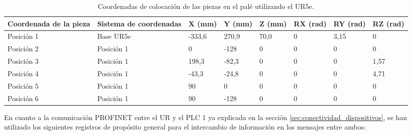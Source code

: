 \begin{table}[H]
\begin{center}

\renewcommand{\arraystretch}{1.5}
\begin{tabular}{|M{2.45cm}|M{2.65cm}|M{1.2cm}|M{1.2cm}|M{1.2cm}|M{1.1cm}|M{1.1cm}|M{1.1cm}|}
\hline
\textbf{Coordenada de la pieza} &
\textbf{Sistema de coordenadas} & 
\textbf{X (mm)} & 
\textbf{Y (mm)} & 
\textbf{Z (mm)} &
\textbf{RX (rad)} &
\textbf{RY (rad)} &
\textbf{RZ (rad)} \\
\hline
Posición 1  & Base UR5e &  -333,6 & 270,9 & 70,0 & 0 & 3,15 & 0 \\
\hline
Posición 2  & Posición 1 &  0 & -128 & 0 & 0 & 0 & 0 \\
\hline
Posición 3  & Posición 1 &  198,3 & -82,3 & 0 & 0 & 0 & 1,57 \\
\hline
Posición 4  & Posición 1 &  -43,3 & -24,8 & 0 & 0 & 0 & 4,71 \\
\hline
Posición 5  & Posición 1 &  90 & 0 & 0 & 0 & 0 & 0 \\
\hline
Posición 6  & Posición 1 &  90 & -128 & 0 & 0 & 0 & 0 \\
\hline
\end{tabular}

\caption{\centering Coordenadas de colocación de las piezas en el palé utilizando el UR5e.}
\label{cuadro:coordenadas}
\end{center}
\end{table}

En cuanto a la comunicación PROFINET entre el UR y el PLC 1 ya explicada en la sección \ref{sec:conectividad_dispositivos}, se han utilizado los siguientes registros de propósito general para el intercambio de información en los mensajes entre ambos:

